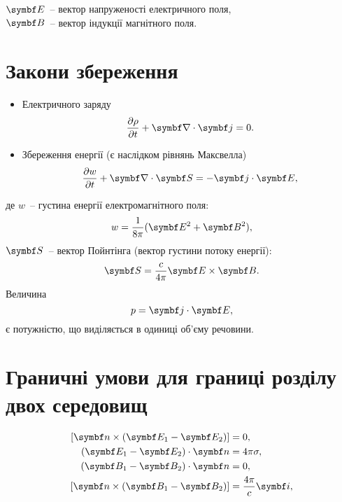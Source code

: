 \noindent%
$ \Efield $~-- вектор напруженості електричного поля,\\
$ \Bfield $~-- вектор індукції магнітного поля.


\section{Закони збереження}

\begin{itemize}
	\item Електричного заряду
	      \begin{equation}
		      \frac{\partial \rho}{\partial t} + \divg\vect{j} = 0.
	      \end{equation}
	\item Збереження енергії (є наслідком рівнянь Максвелла)
	      \begin{equation}
		      \frac{\partial w}{\partial t} + \divg\vect{S} = -  \vect{j}\cdot\Efield,
	      \end{equation}
\end{itemize}
де $ w $~-- густина енергії електромагнітного поля:
\begin{equation}
	w = \frac{1}{8\pi} (\Efield^2 + \Bfield^2),
\end{equation}
\noindent%
$ \vect{S} $~-- вектор Пойнтінга (вектор густини потоку енергії):
\begin{equation}
	\vect{S} = \frac{c}{4\pi} \Efield\times\Bfield.
\end{equation}
Величина
\begin{equation}
	p =\vect{j}\cdot\Efield ,
\end{equation}
є потужністю, що виділяється в одиниці об'єму речовини.

\section{Граничні умови для границі розділу двох середовищ}

\begin{align}
	\left[ \vect{n} \times (\Efield_{1} - \Efield_{2}) \right] & = 0, \label{EnBc}                        \\
	\left( \Efield_{1} - \Efield_{2}\right) \cdot \vect{n}     & = 4\pi\sigma, \label{EtauBc}             \\
	\left( \Bfield_{1} - \Bfield_{2}\right) \cdot \vect{n}     & = 0,    \label{BnBc}                     \\
	\left[ \vect{n} \times (\Bfield_{1} - \Bfield_{2}) \right] & = \frac{4\pi}{c}\vect{i} \label{BtauBc},
\end{align}

